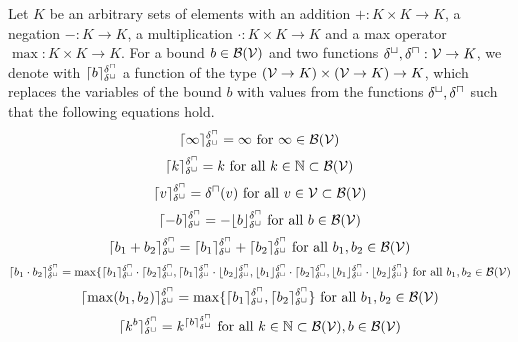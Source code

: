 \begin{definition}
  Let $K$ be an arbitrary sets of elements with an addition $+: K \times K \rightarrow K$, a negation $-: K \rightarrow K$, a multiplication $\cdot: K \times K \rightarrow K$ and a max operator $\max: K \times K \rightarrow K$.
  For a bound $b \in \mathcal{B}(\mathcal{V})$ and two functions $\delta^\sqcup, \delta^\sqcap: \mathcal{V} \rightarrow K$, we denote with $\lceil b \rceil^{\delta^\sqcap}_{\delta^\sqcup}$ a function of the type $(\mathcal{V} \rightarrow K) \times (\mathcal{V} \rightarrow K) \rightarrow K$, which replaces the variables of the bound $b$ with values from the functions $\delta^\sqcup, \delta^\sqcap$ such that the following equations hold.
  \[ \lceil \infty \rceil^{\delta^\sqcap}_{\delta^\sqcup} = \infty \text{ for } \infty \in \mathcal{B}(\mathcal{V}) \]
  \[ \lceil k \rceil^{\delta^\sqcap}_{\delta^\sqcup} = k \text{ for all } k \in \mathbb{N} \subset \mathcal{B}(\mathcal{V}) \] 
  \[ \lceil v \rceil^{\delta^\sqcap}_{\delta^\sqcup} = \delta^\sqcap(v) \text{ for all } v \in \mathcal{V} \subset \mathcal{B}(\mathcal{V}) \] 
  \[ \lceil -b \rceil^{\delta^\sqcap}_{\delta^\sqcup} = -\lfloor b \rfloor^{\delta^\sqcap}_{\delta^\sqcup} \text{ for all } b \in \mathcal{B}(\mathcal{V}) \] 
  \[ \lceil b_1 + b_2 \rceil^{\delta^\sqcap}_{\delta^\sqcup} = \lceil b_1 \rceil^{\delta^\sqcap}_{\delta^\sqcup} + \lceil b_2 \rceil^{\delta^\sqcap}_{\delta^\sqcup} \text{ for all } b_1, b_2 \in \mathcal{B}(\mathcal{V}) \] 
  \[ \lceil b_1 \cdot b_2 \rceil^{\delta^\sqcap}_{\delta^\sqcup} = \max \lbrace 
    \lceil b_1 \rceil^{\delta^\sqcap}_{\delta^\sqcup} \cdot \lceil b_2 \rceil^{\delta^\sqcap}_{\delta^\sqcup},
    \lceil b_1 \rceil^{\delta^\sqcap}_{\delta^\sqcup} \cdot \lfloor b_2 \rfloor^{\delta^\sqcap}_{\delta^\sqcup},
    \lfloor b_1 \rfloor^{\delta^\sqcap}_{\delta^\sqcup} \cdot \lceil b_2 \rceil^{\delta^\sqcap}_{\delta^\sqcup},
    \lfloor b_1 \rfloor^{\delta^\sqcap}_{\delta^\sqcup} \cdot \lfloor b_2 \rfloor^{\delta^\sqcap}_{\delta^\sqcup}
   \rbrace \text{ for all } b_1, b_2 \in \mathcal{B}(\mathcal{V}) \] 
  \[ \lceil \max(b_1, b_2) \rceil^{\delta^\sqcap}_{\delta^\sqcup} = \max \lbrace \lceil b_1 \rceil^{\delta^\sqcap}_{\delta^\sqcup}, \lceil b_2 \rceil^{\delta^\sqcap}_{\delta^\sqcup} \rbrace \text{ for all } b_1, b_2 \in \mathcal{B}(\mathcal{V}) \]
  \[ \lceil k^b \rceil^{\delta^\sqcap}_{\delta^\sqcup} = k^{\lceil b \rceil^{\delta^\sqcap}_{\delta^\sqcup}} \text{ for all } k \in \mathbb{N} \subset \mathcal{B}(\mathcal{V}), b \in \mathcal{B}(\mathcal{V}) \]  
\end{definition}

